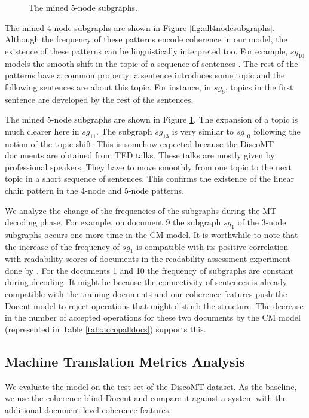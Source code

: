 \begin{figure}[!t]
{\begin{tabular}{ccc}
      
\end{tabular}
}
\caption{The mined 5-node subgraphs.}
\label{fig:all5nodesubgraphs}
\end{figure}


The mined 4-node subgraphs are shown in Figure \ref{fig:all4nodesubgraphs}. 
Although the frequency of these patterns encode coherence in our model, the existence of these patterns can be linguistically interpreted too. 
For example, $sg_{10}$ models the smooth shift in the topic of a sequence of sentences \cite{Mesgar2015}. 
The rest of the patterns have a common property: a sentence introduces some topic and the following sentences are about this topic. 
For instance, in $sg_6$, topics in the first sentence are developed by the rest of the sentences.

The mined 5-node subgraphs are shown in Figure \ref{fig:all5nodesubgraphs}. 
The expansion of a topic is much clearer here in $sg_{11}$. 
The subgraph  $sg_{13}$ is very similar to $sg_{10}$ following the notion of the topic shift. 
This is somehow expected because the DiscoMT documents are obtained from TED talks. 
These talks are mostly given by professional speakers. 
They have to move smoothly from one topic to the next topic in a short sequence of sentences. 
This confirms the existence of the linear chain pattern in the 4-node and 5-node patterns.




We analyze the change of the frequencies of the subgraphs during the MT decoding phase. 
For example, on document 9 the subgraph $sg_1$ of the 3-node subgraphs occurs one more time in the CM model.
It is worthwhile to note that the increase of the frequency of $sg_1$ is compatible with its positive correlation with readability scores of documents in the readability assessment experiment done by . 
For the documents 1 and 10 the frequency of subgraphs are constant during decoding. 
It might be because the connectivity of sentences is already compatible with the training documents and our coherence features push the Docent model to reject operations that might disturb the structure. 
The decrease in the number of accepted operations for these two documents by the CM model (represented in Table 
\ref{tab:accopalldocs}) supports this.



\subsection{Machine Translation Metrics Analysis}
%
We evaluate the model on the test set of the DiscoMT dataset. As the baseline, we use the coherence-blind Docent and compare it against a system with the additional document-level coherence features. 

